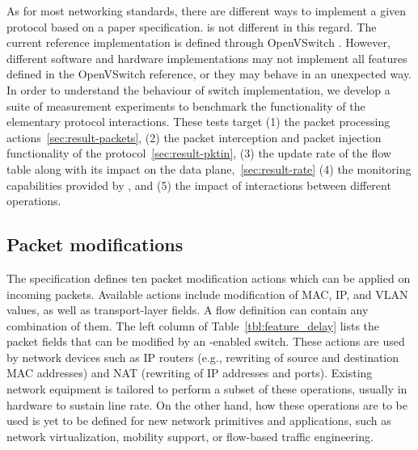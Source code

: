 As for most networking standards, there are different ways to implement a
given protocol based on a paper specification. \of is not different in this
regard. The current reference implementation is defined through OpenVSwitch
\cite{openvswitch}. However, different software and hardware implementations may
not implement all features defined in the OpenVSwitch reference, or they may
behave in an unexpected way. In order to understand the behaviour of switch \of
implementation, we develop a suite of measurement experiments to
benchmark the functionality of the elementary protocol interactions.  These
tests target (1) the \of packet processing actions~\ref{sec:result-packets}, (2)
the packet interception and packet injection functionality of the
protocol~\ref{sec:result-pktin}, (3) the update rate of the \of flow table along
with its impact on the data plane,~\ref{sec:result-rate} (4) the monitoring
capabilities provided by \of, and (5) the impact of interactions between
different \of operations.



\subsection{Packet modifications}\label{sec:results-packets}

The \of specification \cite{openflow-spec} defines ten packet
modification actions which can be applied on incoming
packets. Available actions include modification of MAC, IP, and VLAN
values, as well as transport-layer fields. A flow definition can
contain any combination of them. The left column of
Table~\ref{tbl:feature_delay} lists the packet fields that can be
modified by an \of-enabled switch.
These actions are used by network devices such as IP routers (e.g.,
rewriting of source and destination MAC addresses) and NAT (rewriting
of IP addresses and ports). Existing network equipment is tailored to
perform a subset of these operations, usually in hardware to sustain
line rate. On the other hand, how these operations are to be used is
yet to be defined for new network primitives and applications, such as
network virtualization, mobility support, or flow-based traffic
engineering.

